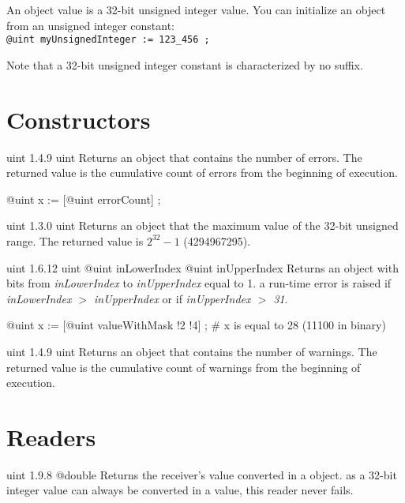 

An  object value is a 32-bit unsigned integer value. You can initialize an  object from an unsigned integer constant:\\

\texttt{@uint myUnsignedInteger := 123\_456 ;}

Note that a 32-bit unsigned integer constant is characterized by no suffix.

\section{Constructors}

{uint}
{1.4.9}
{uint}
{Returns an  object that contains the number of errors.}
{The returned value is the cumulative count of errors from the beginning of execution.}

\exempleUneLigne
{}
{@uint x := [@uint errorCount] ;}

{uint}
{1.3.0}
{uint}
{Returns an  object that the maximum value of the 32-bit unsigned range.}
{The returned value is $2^{32}-1$ (4294967295).}


{uint}
{1.6.12}
{uint}
{@uint inLowerIndex}
{@uint inUpperIndex}
{Returns an  object with bits from \emph{inLowerIndex} to \emph{inUpperIndex} equal to 1.}
{a run-time error is raised if \emph{inLowerIndex $>$ inUpperIndex} or if \emph{inUpperIndex $>$ 31}.}


\exempleUneLigne
{}
{@uint x := [@uint valueWithMask !2 !4] ; \# x is equal to 28 (11100 in binary)}





{uint}
{1.4.9}
{uint}
{Returns an  object that contains the number of warnings.}
{The returned value is the cumulative count of warnings from the beginning of execution.}

\section{Readers}

{uint}
{1.9.8}
{@double}
{Returns the receiver's value converted in a  object.}
{as a 32-bit integer value can always be converted in a  value, this reader never fails.}



